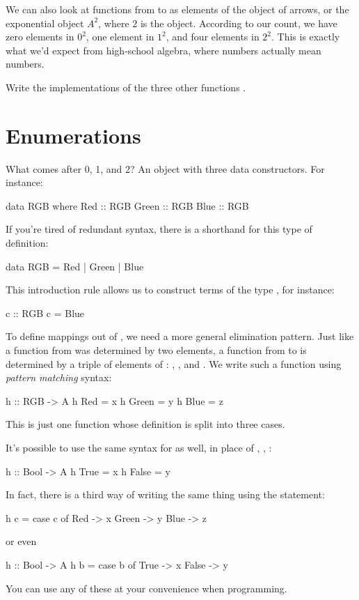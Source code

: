 \documentclass[DaoFP]{subfiles}
\begin{document}
We can also look at functions from  to  as elements of the object of arrows, or the exponential object $A^2$, where $2$ is the  object. According to our count, we have zero elements in $0^2$, one element in $1^2$, and four elements in $2^2$. This is exactly what we'd expect from high-school algebra, where numbers actually mean numbers.

\begin{exercise}
Write the implementations of the three other functions .
\end{exercise}

\section{Enumerations}

What comes after 0, 1, and 2? An object with three data constructors. For instance:
\begin{haskell}
data RGB where
  Red   :: RGB
  Green :: RGB
  Blue  :: RGB
\end{haskell}
If you're tired of redundant syntax, there is a shorthand for this type of definition:

\begin{haskell}
data RGB = Red | Green | Blue
\end{haskell}
This introduction rule allows us to construct terms of the type , for instance:
\begin{haskell}
c :: RGB
c = Blue
\end{haskell}
To define mappings out of , we need a more general elimination pattern. Just like a function from  was determined by two elements, a function from  to  is determined by a triple of elements of : , , and . We write such a function using \emph{pattern matching} syntax:
\begin{haskell}
h :: RGB -> A
h Red   = x
h Green = y
h Blue  = z
\end{haskell}
This is just one function whose definition is split into three cases. 

It's possible to use the same syntax for  as well, in place of , , :
\begin{haskell}
h :: Bool -> A
h True  = x
h False = y
\end{haskell}
In fact, there is a third way of writing the same thing using the  statement:
\begin{haskell}
h c = case c of
  Red   -> x
  Green -> y
  Blue  -> z
\end{haskell}
or even
\begin{haskell}
h :: Bool -> A
h b = case b of
  True  -> x
  False -> y
\end{haskell}
You can use any of these at your convenience when programming.
\end{document}
